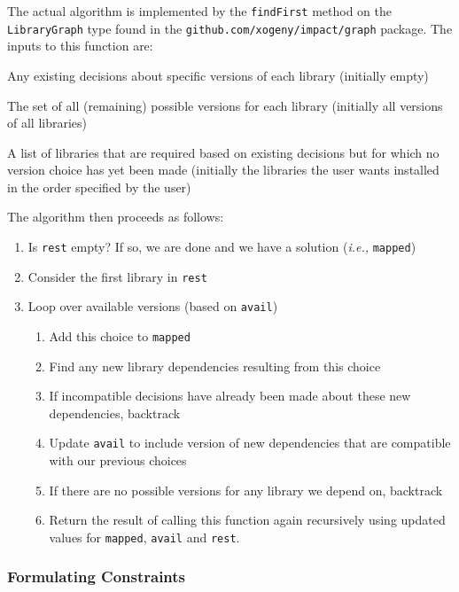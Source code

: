 \documentclass[11pt,a4paper,twocolumn]{article}
\newcommand{\code}[1]{\texttt{#1}} %
\begin{document}
The actual algorithm is implemented by the \code{findFirst} method on
the \code{LibraryGraph} type found in the
\code{github.com/xogeny/impact/graph} package.  The inputs to this function are:

\begin{description}[noitemsep]
  \item[\code{mapped}] Any existing decisions about specific versions of each library
    (initially empty)
  \item[\code{avail}] The set of all (remaining) possible versions for each library
    (initially all versions of all libraries)
  \item[\code{rest}] A list of libraries that are required based on
    existing decisions but for which no version choice has yet been
    made (initially the libraries the user wants installed in the
    order specified by the user)
\end{description}

The algorithm then proceeds as follows:

\begin{enumerate}
  \item Is \code{rest} empty?  If so, we are done and we have a solution
    (\emph{i.e.,} \code{mapped})
  \item Consider the first library in \code{rest}
  \item Loop over available versions (based on \code{avail})
    \begin{enumerate}
      \item Add this choice to \code{mapped}
      \item Find any new library dependencies resulting from this choice
      \item If incompatible decisions have already been made about
        these new dependencies, backtrack
      \item Update \code{avail} to include version of new dependencies
        that are compatible with our previous choices
      \item If there are no possible versions for any library we depend on, backtrack
      \item Return the result of calling this function again
        recursively using updated values for \code{mapped},
        \code{avail} and \code{rest}.
    \end{enumerate}
\end{enumerate}

\subsubsection{Formulating Constraints}
\end{document}

